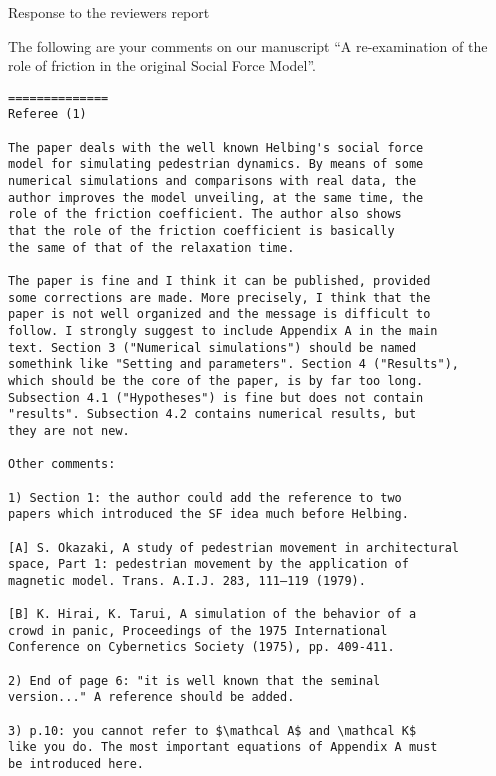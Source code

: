 \documentclass[a4paper,12pt]{letter}
\begin{document}

\begin{letter}{Response to the reviewers report}

\opening{}

The following are your comments on our manuscript ``A re-examination of the role 
of friction in the original Social Force Model''. 


\begin{verbatim}
==============
Referee (1)

The paper deals with the well known Helbing's social force 
model for simulating pedestrian dynamics. By means of some 
numerical simulations and comparisons with real data, the 
author improves the model unveiling, at the same time, the 
role of the friction coefficient. The author also shows 
that the role of the friction coefficient is basically 
the same of that of the relaxation time.

The paper is fine and I think it can be published, provided 
some corrections are made. More precisely, I think that the 
paper is not well organized and the message is difficult to 
follow. I strongly suggest to include Appendix A in the main 
text. Section 3 ("Numerical simulations") should be named 
somethink like "Setting and parameters". Section 4 ("Results"),
which should be the core of the paper, is by far too long. 
Subsection 4.1 ("Hypotheses") is fine but does not contain 
"results". Subsection 4.2 contains numerical results, but 
they are not new.

Other comments:

1) Section 1: the author could add the reference to two 
papers which introduced the SF idea much before Helbing.

[A] S. Okazaki, A study of pedestrian movement in architectural
space, Part 1: pedestrian movement by the application of 
magnetic model. Trans. A.I.J. 283, 111–119 (1979).

[B] K. Hirai, K. Tarui, A simulation of the behavior of a 
crowd in panic, Proceedings of the 1975 International 
Conference on Cybernetics Society (1975), pp. 409-411.

2) End of page 6: "it is well known that the seminal 
version..." A reference should be added.

3) p.10: you cannot refer to $\mathcal A$ and \mathcal K$ 
like you do. The most important equations of Appendix A must 
be introduced here.


\end{verbatim}
\end{letter}
\end{document}
